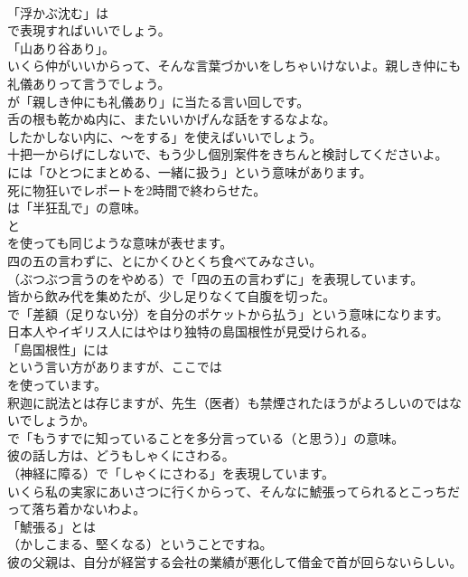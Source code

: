 \documentclass[8pt]{extreport}
\begin{document}
\begin{CJK}{UTF8}{min}
\\	「浮かぶ沈む」は
\\	で表現すればいいでしょう。
\\	「山あり谷あり」。	
\\	いくら仲がいいからって、そんな言葉づかいをしちゃいけないよ。親しき仲にも礼儀ありって言うでしょう。 
\\	が「親しき仲にも礼儀あり」に当たる言い回しです。	
\\	舌の根も乾かぬ内に、またいいかげんな話をするなよな。 
\\	したかしない内に、～をする」を使えばいいでしょう。	
\\	十把一からげにしないで、もう少し個別案件をきちんと検討してくださいよ。 
\\	には「ひとつにまとめる、一緒に扱う」という意味があります。	
\\	死に物狂いでレポートを2時間で終わらせた。 
\\	は「半狂乱で」の意味。
\\	と
\\	を使っても同じような意味が表せます。	
\\	四の五の言わずに、とにかくひとくち食べてみなさい。 
\\	（ぶつぶつ言うのをやめる）で「四の五の言わずに」を表現しています。	
\\	皆から飲み代を集めたが、少し足りなくて自腹を切った。 
\\	で「差額（足りない分）を自分のポケットから払う」という意味になります。	
\\	日本人やイギリス人にはやはり独特の島国根性が見受けられる。 
\\	「島国根性」には 
\\	という言い方がありますが、ここでは 
\\	を使っています。	
\\	釈迦に説法とは存じますが、先生（医者）も禁煙されたほうがよろしいのではないでしょうか。 
\\	で「もうすでに知っていることを多分言っている（と思う）」の意味。	
\\	彼の話し方は、どうもしゃくにさわる。 
\\	（神経に障る）で「しゃくにさわる」を表現しています。	
\\	いくら私の実家にあいさつに行くからって、そんなに鯱張ってられるとこっちだって落ち着かないわよ。 
\\	「鯱張る」とは
\\	（かしこまる、堅くなる）ということですね。	
\\	彼の父親は、自分が経営する会社の業績が悪化して借金で首が回らないらしい。 

\end{CJK}
\end{document}
